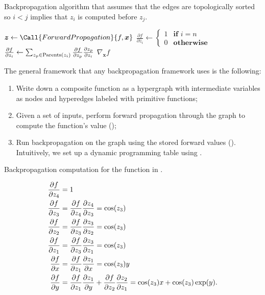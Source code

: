 \begin{algorithm}
  \caption{Backpropagation algorithm that assumes that the edges are
  topologically sorted so $i<j$ implies that $z_i$ is computed before $z_j$.}
  \label{alg:backpropagation}

  \begin{algorithmic}[1]
      \State $\bm{z} \gets \Call{ForwardPropagation}{f,\bm{x}}$
      \State $\frac{\partial f}{\partial z_i} \gets \begin{cases}
        1 & \textbf{if } i=n \\
        0 & \textbf{otherwise}
      \end{cases}$ 
       
        \State $\pdv{f}{z_i} \gets \sum_{z_p\in\mathrm{Parents}(z_i)} \pdv{f}{z_p} \pdv{z_p}{z_i}$ 
      \EndFor
      \State \Return $\nabla_{\bm{x}} f$
    \EndFunction
  \end{algorithmic}
\end{algorithm}

The general framework that any backpropagation framework uses is the following:
\begin{enumerate}
  \item Write down a composite function as a hypergraph with intermediate
    variables as nodes and hyperedges labeled with primitive functions;
  \item Given a set of inputs, perform forward propagation through the graph to
    compute the function's value ();
  \item Run backpropagation on the graph using the stored forward values
    (). Intuitively, we set up a dynamic programming
    table using .
\end{enumerate}

\begin{example}
  \caption{Backpropagation computation for the function in .}
  \begin{align*}
    \pdv{f}{z_4} &= 1 \\
    \pdv{f}{z_3} &= \pdv{f}{z_4} \pdv{z_4}{z_3} = \cos(z_3) \\
    \pdv{f}{z_2} &= \pdv{f}{z_3} \pdv{z_3}{z_2} = \cos(z_3) \\
    \pdv{f}{z_1} &= \pdv{f}{z_3} \pdv{z_3}{z_1} = \cos(z_3) \\
    \pdv{f}{x} &= \pdv{f}{z_1} \pdv{z_1}{x} = \cos(z_3) y \\
    \pdv{f}{y} &= \pdv{f}{z_1} \pdv{z_1}{y} + \pdv{f}{z_2} \pdv{z_2}{z_1} = \cos(z_3) x + \cos(z_3) \exp(y)
  .\end{align*}
\end{example}
